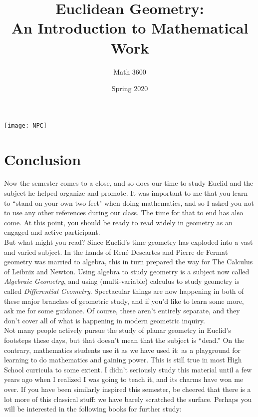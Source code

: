 \documentclass{tufte-handout}
\title{Euclidean Geometry:\\An Introduction to Mathematical Work}
\author[Math 3600]{Math 3600}
\date{Spring 2020}
\theoremstyle{definition}
\begin{document}
\maketitle

\begin{marginfigure}
    \texttt{[image: NPC]}
\end{marginfigure}

\section*{Conclusion}


Now the semester comes to a close, and so does our time to study Euclid and the subject he helped organize and promote. It was important to me that you learn to ``stand on your own two feet" when doing mathematics, and so I asked you not to use any other references during our class. The time for that to end has also come. At this point, you should be ready to read widely in geometry as an engaged and active participant.\\

But what might you read? Since Euclid's time geometry has exploded into a vast and varied subject. 
In the hands of Ren\'{e} Descartes and Pierre de Fermat geometry was married to algebra, this in turn prepared the way for The Calculus of Leibniz and Newton. 
Using algebra to study geometry is a subject now called \emph{Algebraic Geometry}, and using (multi-variable) calculus to study geometry is called \emph{Differential Geometry}.  Spectacular things are now happening in both of these major branches of geometric study, and if you'd like to learn some more, ask me for some guidance. 
Of course, these aren't entirely separate, and they don't cover all of what is happening in modern geometric inquiry.\\

Not many people actively pursue the study of planar geometry in Euclid's footsteps these days, but that doesn't mean that the subject is ``dead.'' On the contrary, mathematics students use it as we have used it: as a playground for learning to do mathematics and gaining power. This is still true in most High School curricula to some extent. I didn't seriously study this material until a few years ago when I realized I was going to teach it, and its charms have won me over. If you have been similarly inspired this semester, be cheered that there is a lot more of this classical stuff: we have barely scratched the surface. Perhaps you will be interested in the following books for further study:
\end{document}
